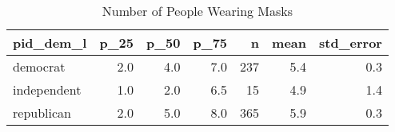 \begin{table}[!htb]
\centering
\caption{Number of People Wearing Masks} 
\label{tab:trump_sum}
\begin{tabular}{lrrrrrr}
  \hline
pid\_dem\_l & p\_25 & p\_50 & p\_75 & n & mean & std\_error \\ 
  \hline
democrat & 2.0 & 4.0 & 7.0 & 237 & 5.4 & 0.3 \\ 
  independent & 1.0 & 2.0 & 6.5 & 15 & 4.9 & 1.4 \\ 
  republican & 2.0 & 5.0 & 8.0 & 365 & 5.9 & 0.3 \\ 
   \hline
\end{tabular}
\end{table}
